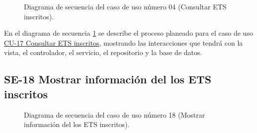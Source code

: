 \begin{figure}[htbp!]
	\begin{center}
		\caption{Diagrama de secuencia del caso de uso número 04 (Consultar ETS inscritos).}
		\label{fig:Diagrama de secuencia CU-17}
	\end{center}
\end{figure}

En el diagrama de secuencia \ref{fig:Diagrama de secuencia CU-17} se describe el proceso planeado para el caso de uso \hyperlink{CU-17}{CU-17 Consultar  ETS inscritos}, mostrando las interacciones que tendrá con la vista, el controlador, el servicio, el repositorio y la base de datos.

\newpage

\subsection{SE-18 Mostrar información del los ETS inscritos}

\begin{figure}[htbp!]
	\begin{center}
		\caption{Diagrama de secuencia del caso de uso número 18 (Mostrar información del los ETS inscritos).}
		\label{fig:Diagrama de secuencia CU-18}
	\end{center}
\end{figure}

